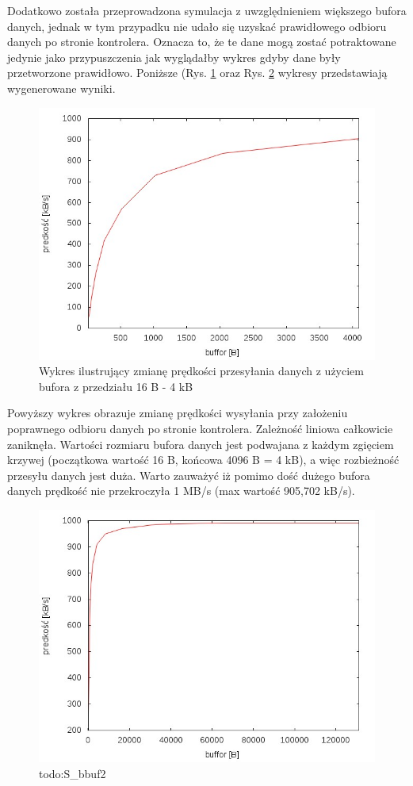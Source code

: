 \documentclass{BscUS}
\begin{document}
\noindent Dodatkowo została przeprowadzona symulacja z uwzględnieniem większego bufora danych, jednak w tym przypadku nie udało się uzyskać prawidłowego odbioru danych  po stronie kontrolera. Oznacza to, że te dane mogą zostać potraktowane jedynie jako przypuszczenia jak wyglądałby wykres gdyby dane były przetworzone prawidłowo. Poniższe (Rys. \ref{fig:S_bbuf1} oraz Rys. \ref{fig:S_bbuf2} wykresy przedstawiają wygenerowane wyniki.

\begin{figure}[H]
{
\centering
\includegraphics[width=1\textwidth]{./img/S_bbuf1}
\caption{Wykres ilustrujący zmianę prędkości przesyłania danych z użyciem bufora z przedziału 16 B - 4 kB}
\label{fig:S_bbuf1}
}
\end{figure}
\noindent Powyższy wykres obrazuje zmianę prędkości wysyłania przy założeniu poprawnego odbioru danych po stronie kontrolera. Zależność liniowa całkowicie zaniknęła. Wartości rozmiaru bufora danych jest podwajana z każdym zgięciem krzywej (początkowa wartość 16 B, końcowa 4096 B = 4 kB), a więc rozbieżność przesyłu danych jest duża. Warto zauważyć iż pomimo dość dużego bufora danych prędkość nie przekroczyła 1 MB/s (max wartość 905,702 kB/s).
\begin{figure}[H]
{
\centering
\includegraphics[width=1\textwidth]{./img/S_bbuf2}
\caption{todo:S\_bbuf2}
\label{fig:S_bbuf2}
}
\end{figure}
\end{document}
